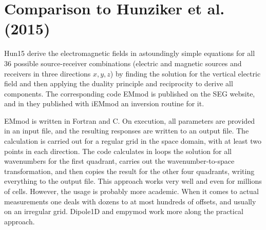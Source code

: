 \documentclass[manuscript]{geophysics}
\newcommand{\tnt}[1]{#1}
\newcommand{\fortran}{\tnt{Fortran}\xspace}
\newcommand{\cc}{\tnt{C}\xspace}
\newcommand{\emmod}{\tnt{EMmod}\xspace}
\newcommand{\iemmod}{\tnt{iEMmod}\xspace}
\newcommand{\empymod}{\tnt{empymod}\xspace}
\newcommand{\dipole}{\tnt{Dipole1D}\xspace}
\begin{document}
\section{Comparison to Hunziker et al. (2015)}

Hun15 derive the electromagnetic fields in astoundingly simple equations for
all 36 possible source-receiver combinations (electric and magnetic sources and
receivers in three directions $x,y,z$) by finding the solution for the
vertical electric field and then applying the duality principle and reciprocity
to derive all components. The corresponding code \emmod is published on the SEG
website, and in \cite{GEO.16.Hunziker} they published with \iemmod an inversion
routine for it.

\emmod is written in \fortran and \cc. On execution, all parameters are
provided in an input file, and the resulting responses are written to an output
file.  The calculation is carried out for a regular grid in the space domain,
with at least two points in each direction. The code calculates in loops the
solution for all wavenumbers for the first quadrant, carries out the
wavenumber-to-space transformation, and then copies the result for the other
four quadrants, writing everything to the output file. This approach works very
well and even for millions of cells. However, the usage is probably more
academic. When it comes to actual measurements one deals with dozens to at most
hundreds of offsets, and usually on an irregular grid. \dipole and \empymod
work more along the practical approach.
\end{document}
